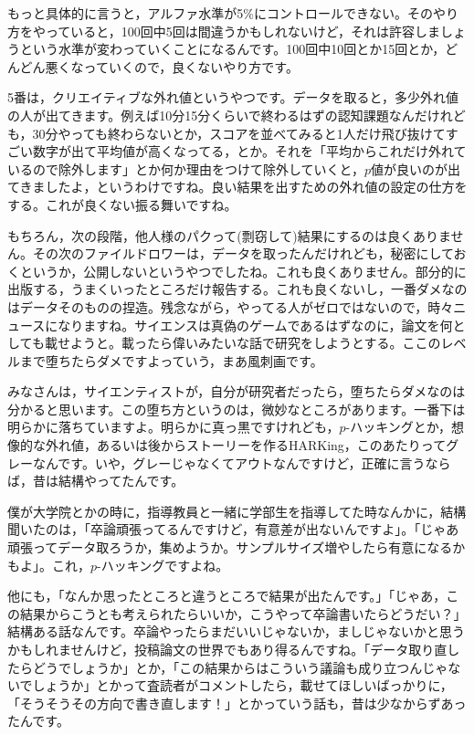 \documentclass{ltjsbook}
\begin{document}
もっと具体的に言うと，アルファ水準が5\%にコントロールできない。そのやり方をやっていると，100回中5回は間違うかもしれないけど，それは許容しましょうという水準が変わっていくことになるんです。100回中10回とか15回とか，どんどん悪くなっていくので，良くないやり方です。

5番は，クリエイティブな外れ値というやつです。データを取ると，多少外れ値の人が出てきます。例えば10分15分くらいで終わるはずの認知課題なんだけれども，30分やっても終わらないとか，スコアを並べてみると1人だけ飛び抜けてすごい数字が出て平均値が高くなってる，とか。それを「平均からこれだけ外れているので除外します」とか何か理由をつけて除外していくと，$p$値が良いのが出てきましたよ，というわけですね。良い結果を出すための外れ値の設定の仕方をする。これが良くない振る舞いですね。

もちろん，次の段階，他人様のパクって(剽窃して)結果にするのは良くありません。その次のファイルドロワーは，データを取ったんだけれども，秘密にしておくというか，公開しないというやつでしたね。これも良くありません。部分的に出版する，うまくいったところだけ報告する。これも良くないし，一番ダメなのはデータそのものの捏造。残念ながら，やってる人がゼロではないので，時々ニュースになりますね。サイエンスは真偽のゲームであるはずなのに，論文を何としても載せようと。載ったら偉いみたいな話で研究をしようとする。ここのレベルまで堕ちたらダメですよっていう，まあ風刺画です。

みなさんは，サイエンティストが，自分が研究者だったら，堕ちたらダメなのは分かると思います。この堕ち方というのは，微妙なところがあります。一番下は明らかに落ちていますよ。明らかに真っ黒ですけれども，$p$-ハッキングとか，想像的な外れ値，あるいは後からストーリーを作るHARKing，このあたりってグレーなんです。いや，グレーじゃなくてアウトなんですけど，正確に言うならば，昔は結構やってたんです。

僕が大学院とかの時に，指導教員と一緒に学部生を指導してた時なんかに，結構聞いたのは，「卒論頑張ってるんですけど，有意差が出ないんですよ」。「じゃあ頑張ってデータ取ろうか，集めようか。サンプルサイズ増やしたら有意になるかもよ」。これ，$p$-ハッキングですよね。

他にも，「なんか思ったところと違うところで結果が出たんです。」「じゃあ，この結果からこうとも考えられたらいいか，こうやって卒論書いたらどうだい？」結構ある話なんです。卒論やったらまだいいじゃないか，ましじゃないかと思うかもしれませんけど，投稿論文の世界でもあり得るんですね。「データ取り直したらどうでしょうか」とか，「この結果からはこういう議論も成り立つんじゃないでしょうか」とかって査読者がコメントしたら，載せてほしいばっかりに，「そうそうその方向で書き直します！」とかっていう話も，昔は少なからずあったんです。
\end{document}
